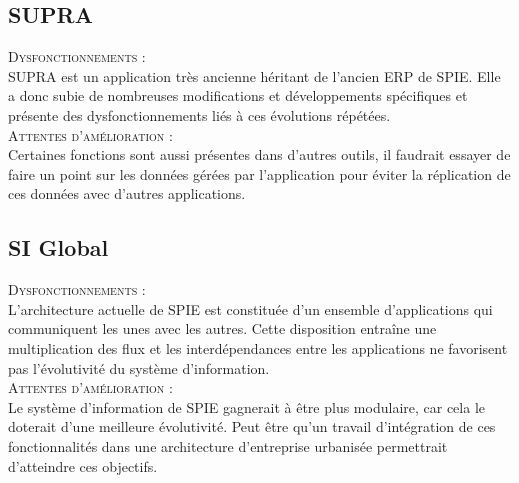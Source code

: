 \subsection{SUPRA}


\noindent\textsc{Dysfonctionnements} : \\

SUPRA est un application très ancienne héritant de l’ancien ERP de SPIE. Elle a donc subie de nombreuses modifications et développements spécifiques et présente des dysfonctionnements liés à ces évolutions répétées. \\

\noindent\textsc{Attentes d’amélioration} : \\

Certaines fonctions sont aussi présentes dans d’autres outils, il faudrait essayer de faire un point sur les données gérées par l’application pour éviter la réplication de ces données avec d’autres applications.

\subsection{SI Global}

\noindent\textsc{Dysfonctionnements} : \\

L’architecture actuelle de SPIE est constituée d’un ensemble d’applications qui communiquent les unes avec les autres. Cette disposition entraîne une multiplication des flux et les interdépendances entre les applications ne favorisent pas l’évolutivité du système d’information. \\

\noindent\textsc{Attentes d’amélioration} : \\

Le système d’information de SPIE gagnerait à être plus modulaire, car cela le doterait d’une meilleure évolutivité. Peut être qu’un travail d’intégration de ces fonctionnalités dans une architecture d’entreprise urbanisée permettrait d’atteindre ces objectifs.